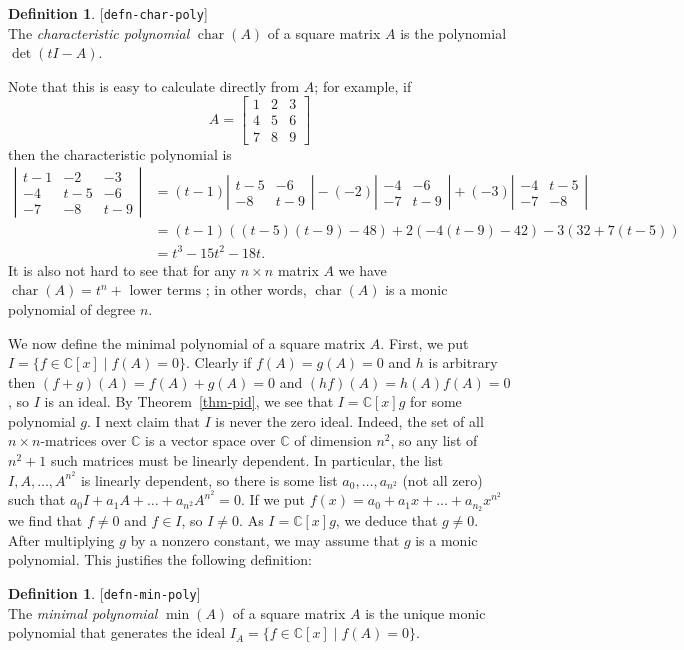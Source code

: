 \documentclass{amsart}
\newcommand{\lbl}[1]{\label{#1}\textup{[\texttt{#1}]}\ \\}
\newcommand{\lbl}{\label}
\newcommand{\bbm}       {\left[\begin{matrix}}
\newcommand{\ebm}       {\end{matrix}\right]}
\newcommand{\chr}       {\operatorname{char}}
\newcommand{\C}         {{\mathbb{C}}}
\newcommand{\tm}        {\times}
\newcommand{\st}        {\;|\;}
\renewcommand{\:}{\colon}
\theoremstyle{definition}
\newtheorem{definition}[theorem]{Definition}
\begin{document}
\begin{definition}\lbl{defn-char-poly}
 The \emph{characteristic polynomial} $\chr(A)$ of a square matrix
 $A$ is the polynomial $\det(tI-A)$.
\end{definition}
Note that this is easy to calculate directly from $A$; for example, if
\[ A = \bbm 1&2&3 \\ 4&5&6 \\ 7&8&9 \ebm \]
then the characteristic polynomial is
\begin{align*}
 \left|\begin{array}{ccc}
  t-1&-2&-3 \\ -4&t-5&-6 \\ -7&-8&t-9
 \end{array}\right| &=
    (t-1) \left|\begin{array}{cc} t-5&-6\\-8&t-9\end{array}\right| -
    (-2)  \left|\begin{array}{cc} -4&-6 \\ -7&t-9 \end{array}\right| +
    (-3)  \left|\begin{array}{cc} -4&t-5\\ -7&-8 \end{array}\right|\\
 &= (t-1)((t-5)(t-9)-48) + 2(-4(t-9)-42) -3(32+7(t-5)) \\
 &= t^3 - 15 t^2 -18 t.
\end{align*}
It is also not hard to see that for any $n\tm n$ matrix $A$ we have
$\chr(A)=t^n+\text{ lower terms }$; in other words, $\chr(A)$ is a
monic polynomial of degree $n$.

We now define the minimal polynomial of a square matrix $A$.  First,
we put $I=\{f\in\C[x]\st f(A)=0\}$.  Clearly if $f(A)=g(A)=0$ and $h$
is arbitrary then $(f+g)(A)=f(A)+g(A)=0$ and $(hf)(A)=h(A)f(A)=0$, so
$I$ is an ideal.  By Theorem~\ref{thm-pid}, we see that $I=\C[x]g$ for
some polynomial $g$.  I next claim that $I$ is never the zero ideal.
Indeed, the set of all $n\tm n$-matrices over $\C$ is a vector space
over $\C$ of dimension $n^2$, so any list of $n^2+1$ such matrices
must be linearly dependent.  In particular, the list
$I,A,\ldots,A^{n^2}$ is linearly dependent, so there is some list
$a_0,\ldots,a_{n^2}$ (not all zero) such that
$a_0I+a_1A+\ldots+a_{n^2}A^{n^2}=0$.  If we put
$f(x)=a_0+a_1x+\ldots+a_{n_2}x^{n^2}$ we find that $f\neq 0$ and 
$f\in I$, so $I\neq 0$.  As $I=\C[x]g$, we deduce that $g\neq 0$.
After multiplying $g$ by a nonzero constant, we may assume that $g$ is
a monic polynomial.  This justifies the following definition:
\begin{definition}\lbl{defn-min-poly}
 The \emph{minimal polynomial} $\min(A)$ of a square matrix $A$ is the
 unique monic polynomial that generates the ideal
 $I_A=\{f\in\C[x]\st f(A)=0\}$.
\end{definition}
\end{document}
